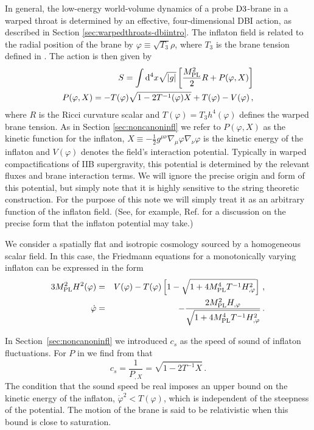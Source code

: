 In general, the low-energy world-volume dynamics
of a probe ${\rm D3}$-brane in a warped throat is determined 
by an effective, four-dimensional DBI action, as described in Section
\ref{sec:warpedthroats-dbiintro}.
The inflaton field is related to the radial 
position of the brane by 
$\varphi \equiv \sqrt{T_3} \rho$, where $T_3$ 
is the brane tension defined in . The action is
then given by 
% 
\begin{eqnarray}
\label{eq:DBIaction-dbiintro}
S=\int  \mathrm{d}^4x \sqrt{|g|} \left[ \frac{M_{\mathrm{PL}}^2}{2} R 
+ P (\varphi , X) \right] \\
\label{eq:Pdefn-dbiintro}
P( \varphi ,X) = - T (\varphi)  \sqrt{1 - 2T^{-1} (\varphi ) X}
+T (\varphi)  -V(\varphi)  \,,
\end{eqnarray}
% 
where $R$ is the Ricci curvature scalar and $T(\varphi ) = T_3 h^4 (\varphi )$
defines the warped brane tension. As in Section \ref{sec:noncanoninfl} we refer
to $P(\varphi , X)$ as the kinetic function for the inflaton, 
$X \equiv - \frac{1}{2} g^{\mu\nu} \nabla_{\mu} \varphi \nabla_{\nu} \varphi$
is the kinetic energy of the inflaton and $V(\varphi )$ denotes 
the field's interaction 
potential. 
Typically in warped compactifications of 
IIB supergravity, this potential is determined by the 
relevant fluxes and brane interaction terms. 
We will ignore the precise origin
and form of this potential, but simply
note that it is highly sensitive to the string theoretic construction. For the
purpose of this note we will simply treat it 
as an arbitrary function of the inflaton field.
(See, for example, Ref. \cite{brane5} for a discussion 
on the precise form that the inflaton potential may take.)


We consider a spatially flat and isotropic cosmology 
sourced by a homogeneous scalar field. 
In this case, the Friedmann equations for a monotonically 
varying inflaton can be expressed in the form \cite{brane6} 
% 
\begin{eqnarray}
\label{eq:Friedmann-dbiintro}
3 M_{\mathrm{PL}}^2 H^2(\varphi ) &=& V(\varphi ) -T(\varphi ) 
\left[ 1- \sqrt{1+4M_{\mathrm{PL}}^4T^{-1} H_{,\varphi}^2} \right] \,,\\
\label{eq:phidot-useful}
\dot{\varphi} &=& - \frac{2M_{\mathrm{PL}}^2H_{,\varphi}}{\sqrt{1+4M_{\mathrm{PL}}^4 T^{-1} H_{,\varphi}^2}}
\,.
\end{eqnarray}
% 

In Section~\ref{sec:noncanoninfl} we introduced $c_s$ as the speed of sound of
inflaton fluctuations. For $P$ in  we find from
 that
% 
\begin{equation}
\label{eq:csdefn-dbiintro}
c_s = \frac{1}{P_{,X}} = \sqrt{1 -2T^{-1}X}  \,.
\end{equation}
% 
The condition that the sound speed be real 
imposes an upper bound on the kinetic energy 
of the inflaton, $\dot{\varphi}^2 < T(\varphi)$, which 
is independent of the steepness of the potential.
The motion of the brane is said to be relativistic when this bound is 
close to saturation.
 
